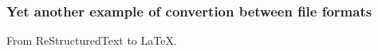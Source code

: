 \begin{frame}[fragile]
  \frametitle{Yet another example of convertion between file formats}
  From ReStructuredText to LaTeX.
\end{frame}
